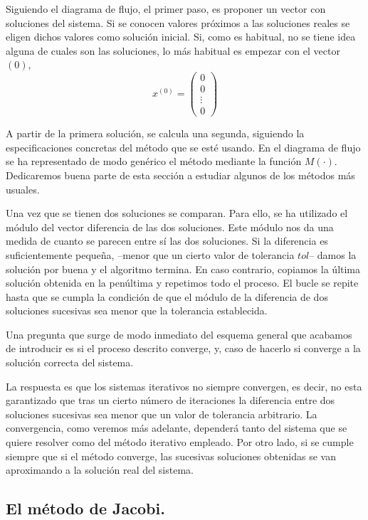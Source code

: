 Siguiendo el diagrama de flujo, el primer paso, es proponer un vector con soluciones del sistema. Si se conocen valores próximos a las soluciones reales se eligen dichos valores como solución inicial. Si, como es habitual, no se tiene idea alguna de cuales son las soluciones, lo más habitual es empezar con el vector $(0)$,
\begin{equation*}
x^{(0)}=\begin{pmatrix}
0\\
0\\
\vdots \\
0
\end{pmatrix}
\end{equation*}

A partir de la primera solución, se calcula una segunda, siguiendo la especificaciones concretas del método que se esté usando. En el diagrama de flujo se ha representado de modo genérico el método mediante la función $M(\cdot)$. Dedicaremos buena parte de esta sección a estudiar algunos de los métodos más usuales.

Una vez que se tienen dos soluciones se comparan. Para ello, se ha utilizado el módulo del vector diferencia de las dos soluciones. Este módulo nos da una medida de cuanto se parecen entre sí las dos soluciones. Si la diferencia es suficientemente pequeña, --menor que un cierto valor de tolerancia $tol$-- damos la solución por buena y el algoritmo termina. En caso contrario, copiamos la última solución obtenida en la penúltima y repetimos todo el proceso. El bucle se repite hasta que se cumpla la condición de que el módulo de la diferencia de dos soluciones sucesivas sea menor que la tolerancia establecida.

Una pregunta que surge de modo inmediato del esquema general que acabamos de introducir es si el proceso descrito converge, y, caso de hacerlo si converge a la solución correcta del sistema. 

La respuesta es que los sistemas iterativos no siempre convergen, es decir, no esta garantizado que tras un cierto número de iteraciones la diferencia entre dos soluciones sucesivas sea menor que un valor de tolerancia arbitrario. La convergencia, como veremos más adelante, dependerá tanto del sistema que se quiere resolver como del método iterativo empleado. Por otro lado, si se cumple siempre que si el método converge, las sucesivas soluciones obtenidas se van aproximando a la solución real del sistema.

\subsection{El método de Jacobi.} 

